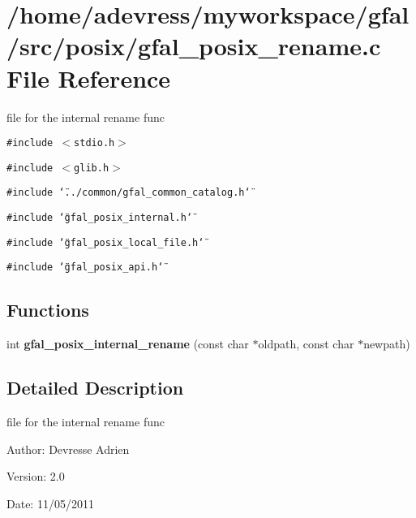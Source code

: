 \section{/home/adevress/myworkspace/gfal/src/posix/gfal\_\-posix\_\-rename.c File Reference}
\label{gfal__posix__rename_8c}
file for the internal rename func 

{\tt \#include $<$stdio.h$>$}\par
{\tt \#include $<$glib.h$>$}\par
{\tt \#include \char`\"{}../common/gfal\_\-common\_\-catalog.h\char`\"{}}\par
{\tt \#include \char`\"{}gfal\_\-posix\_\-internal.h\char`\"{}}\par
{\tt \#include \char`\"{}gfal\_\-posix\_\-local\_\-file.h\char`\"{}}\par
{\tt \#include \char`\"{}gfal\_\-posix\_\-api.h\char`\"{}}\par
\subsection*{Functions}
\begin{CompactItemize}
\item 
int \textbf{gfal\_\-posix\_\-internal\_\-rename} (const char $\ast$oldpath, const char $\ast$newpath)\label{gfal__posix__rename_8c_a9886d08766043a3fc98454d669b592e}

\end{CompactItemize}


\subsection{Detailed Description}
file for the internal rename func 

\begin{Desc}
\item[Author:]Devresse Adrien \end{Desc}
\begin{Desc}
\item[Version:]2.0 \end{Desc}
\begin{Desc}
\item[Date:]11/05/2011 \end{Desc}
